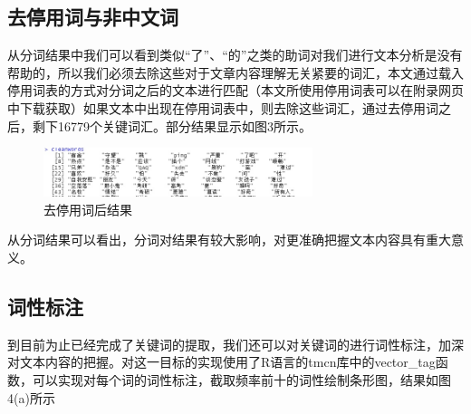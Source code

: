\documentclass[a4paper,12pt]{ctexart}     %
\begin{document}
	\subsection{去停用词与非中文词}
	
		从分词结果中我们可以看到类似“了”、“的”之类的助词对我们进行文本分析是没有帮助的，所以我们必须去除这些对于文章内容理解无关紧要的词汇，本文通过载入停用词表的方式对分词之后的文本进行匹配（本文所使用停用词表可以在附录网页中下载获取）如果文本中出现在停用词表中，则去除这些词汇，通过去停用词之后，剩下16779个关键词汇。部分结果显示如图3所示。
		
		\begin{figure}[H] %
			\centering %
			\includegraphics[width=0.7\textwidth]{去停用词后结果.png} %
			\caption{去停用词后结果} %
			\label{Fig.main 3} %
		\end{figure}
		从分词结果可以看出，分词对结果有较大影响，对更准确把握文本内容具有重大意义。		
	\subsection{词性标注}
	
	到目前为止已经完成了关键词的提取，我们还可以对关键词的进行词性标注，加深对文本内容的把握。对这一目标的实现使用了R语言的tmcn库中的vector\_tag函数，可以实现对每个词的词性标注，截取频率前十的词性绘制条形图，结果如图4(a)所示
	
	
		
\end{document}
